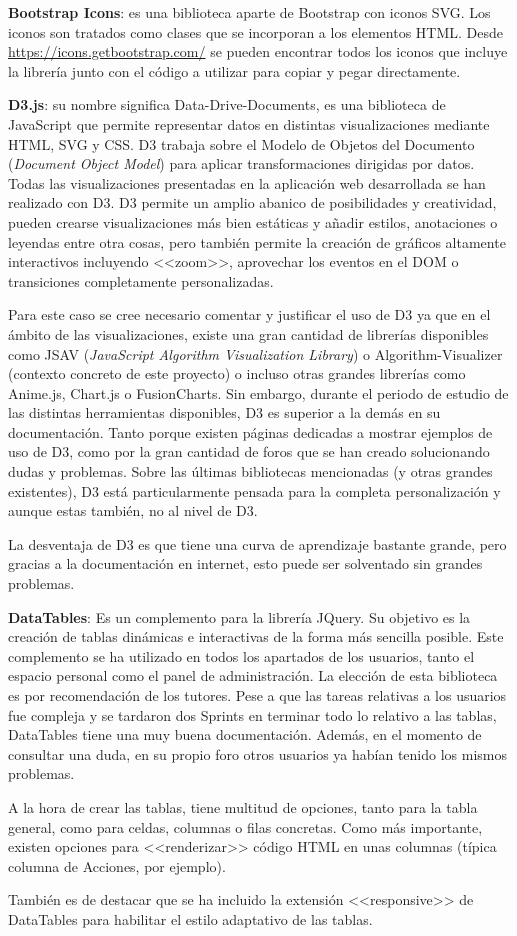 \textbf{Bootstrap Icons}: es una biblioteca aparte de Bootstrap con iconos SVG.
Los iconos son tratados como clases que se incorporan a los elementos HTML.
Desde \url{https://icons.getbootstrap.com/} se pueden encontrar todos los iconos
que incluye la librería junto con el código a utilizar para copiar y pegar
directamente.

\textbf{D3.js}: su nombre significa Data-Drive-Documents, es una biblioteca de
JavaScript que permite representar datos en distintas visualizaciones mediante
HTML, SVG y CSS. D3 trabaja sobre el Modelo de Objetos del Documento
(\emph{Document Object Model}) para aplicar transformaciones dirigidas por
datos. Todas las visualizaciones presentadas en la aplicación web desarrollada
se han realizado con D3. D3 permite un amplio abanico de posibilidades y
creatividad, pueden crearse visualizaciones más bien estáticas y añadir estilos,
anotaciones o leyendas entre otra cosas, pero también permite la creación de
gráficos altamente interactivos incluyendo <<zoom>>, aprovechar los eventos en
el DOM o transiciones completamente personalizadas.

Para este caso se cree necesario comentar y justificar el uso de D3 ya que en el
ámbito de las visualizaciones, existe una gran cantidad de librerías disponibles
como JSAV (\emph{JavaScript Algorithm Visualization Library}) o
Algorithm-Visualizer (contexto concreto de este proyecto) o incluso otras
grandes librerías como Anime.js, Chart.js o FusionCharts. Sin embargo, durante
el periodo de estudio de las distintas herramientas disponibles, D3 es superior
a la demás en su documentación. Tanto porque existen páginas dedicadas a mostrar
ejemplos de uso de D3, como por la gran cantidad de foros que se han creado
solucionando dudas y problemas. Sobre las últimas bibliotecas mencionadas (y
otras grandes existentes), D3 está particularmente pensada para la completa
personalización y aunque estas también, no al nivel de D3.

La desventaja de D3 es que tiene una curva de aprendizaje bastante grande, pero
gracias a la documentación en internet, esto puede ser solventado sin grandes
problemas.

\textbf{DataTables}: Es un complemento para la librería JQuery. Su objetivo es
la creación de tablas dinámicas e interactivas de la forma más sencilla posible.
Este complemento se ha utilizado en todos los apartados de los usuarios, tanto
el espacio personal como el panel de administración. La elección de esta
biblioteca es por recomendación de los tutores. Pese a que las tareas relativas
a los usuarios fue compleja y se tardaron dos Sprints en terminar todo lo
relativo a las tablas, DataTables tiene una muy buena documentación. Además, en
el momento de consultar una duda, en su propio foro otros usuarios ya habían
tenido los mismos problemas.

A la hora de crear las tablas, tiene multitud de opciones, tanto para la tabla
general, como para celdas, columnas o filas concretas. Como más importante,
existen opciones para <<renderizar>> código HTML en unas columnas (típica
columna de Acciones, por ejemplo).

También es de destacar que se ha incluido la extensión <<responsive>> de
DataTables para habilitar el estilo adaptativo de las tablas.
